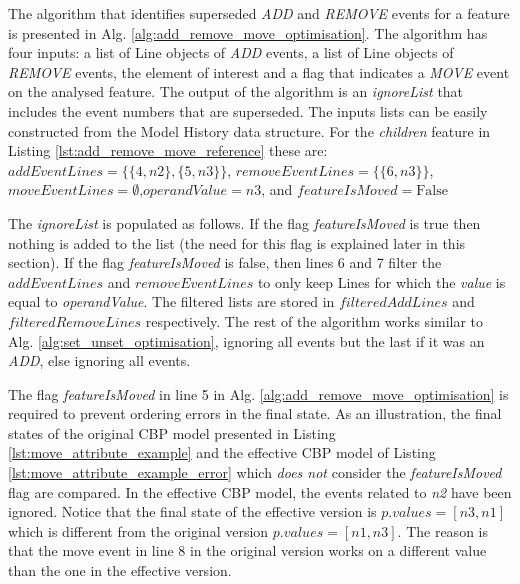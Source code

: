 \documentclass[12pt, a4paper]{report} \usepackage[titletoc]{appendix}
\begin{document}
The algorithm that identifies superseded \emph{ADD} and \emph{REMOVE} events for a feature is presented in Alg. \ref{alg:add_remove_move_optimisation}. The algorithm has four inputs: a list of Line objects of \emph{ADD} events, a list of Line objects of \emph{REMOVE} events, the element of interest and a flag that indicates a \emph{MOVE} event on the analysed feature.  The output of the algorithm is an \emph{ignoreList} that includes the event numbers that are superseded. The inputs lists can be easily constructed from the Model History data structure. For the \emph{children} feature in Listing \ref{lst:add_remove_move_reference} these are: $addEventLines = \{  \{4, n2 \}, \{5, n3 \} \}$, $removeEventLines = \{\{6, n3 \}\}$, $moveEventLines = \emptyset$,\linebreak $operandValue = n3$, and $featureIsMoved = \mathrm{False}$

The \emph{ignoreList} is populated as follows. If the flag \emph{featureIsMoved} is true then nothing is added to the list (the need for this flag is explained later in this section). If the flag \emph{featureIsMoved} is false, then lines 6 and 7 filter the $addEventLines$ and $removeEventLines$ to only keep Lines for which the \emph{value} is equal to \emph{operandValue}. The filtered lists are stored in $filteredAddLines$ and $filteredRemoveLines$ respectively. The rest of the algorithm works similar to Alg. \ref{alg:set_unset_optimisation}, ignoring all events but the last if it was an \emph{ADD}, else ignoring all events. 

The flag \emph{featureIsMoved} in line 5 in Alg. \ref{alg:add_remove_move_optimisation} is required to prevent ordering errors in the final state. As an illustration, the final states of the original CBP model presented in Listing  \ref{lst:move_attribute_example} and the effective CBP model of Listing \ref{lst:move_attribute_example_error} which \emph{does not} consider the \emph{featureIsMoved} flag are compared. In the effective CBP model, the events related to \emph{n2} have been ignored. Notice that the final state of the effective version is $p.values = [n3, n1]$  which is different from the original version $p.values = [n1, n3]$. The reason is that the move event in line 8 in the original version works on a different value than the one in the effective version.
\end{document}
